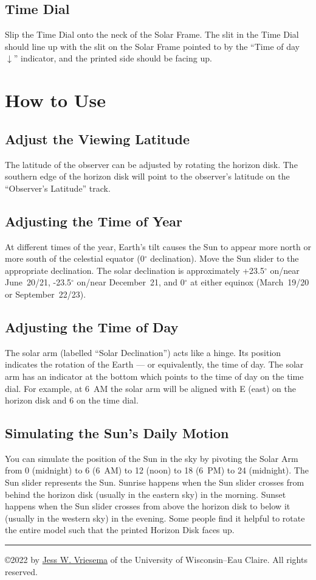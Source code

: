 \documentclass[tikz]{article}
\begin{document}
\begin{multicols}{2}
	\subsection{Time Dial}
	Slip the Time Dial onto the neck of the Solar Frame. The slit in the Time Dial should line up with the slit on the Solar Frame pointed to by the ``Time of day $\downarrow$'' indicator, and the printed side should be facing up. 
	
	
	\section{How to Use}
	\subsection{Adjust the Viewing Latitude}
	The latitude of the observer can be adjusted by rotating the horizon disk. The southern edge of the horizon disk will point to the observer's latitude on the ``Observer's Latitude'' track. 
	
	\subsection{Adjusting the Time of Year}
	At different times of the year, Earth's tilt causes the Sun to appear more north or more south of the celestial equator (0$^\circ$ declination). Move the Sun slider to the appropriate declination. The solar declination is approximately +23.5$^\circ$ on/near June~20/21, -23.5$^\circ$ on/near December~21, and 0$^\circ$ at either equinox (March~19/20 or September~22/23). 
	
	\subsection{Adjusting the Time of Day}
	The solar arm (labelled ``Solar Declination'') acts like a hinge. Its position indicates the rotation of the Earth --- or equivalently, the time of day. The solar arm has an indicator at the bottom which points to the time of day on the time dial. For example, at 6~AM the solar arm will be aligned with E (east) on the horizon disk and 6 on the time dial. 
	
	\subsection{Simulating the Sun's Daily Motion}
	You can simulate the position of the Sun in the sky by pivoting the Solar Arm from 0 (midnight) to 6 (6~AM) to 12 (noon) to 18 (6~PM) to 24 (midnight). The Sun slider represents the Sun. Sunrise happens when the Sun slider crosses from behind the horizon disk (usually in the eastern sky) in the morning. Sunset happens when the Sun slider crosses from above the horizon disk to below it (usually in the western sky) in the evening. Some people find it helpful to rotate the entire model such that the printed Horizon Disk faces up.
\vfill
\hrule 
\noindent\copyright 2022 by \href{https://www.lpl.arizona.edu/~vriesema/}{Jess W. Vriesema} of the University of Wisconsin--Eau Claire. All rights reserved. 
	\end{multicols}
\end{document}
